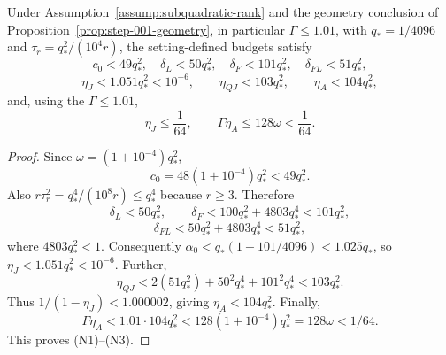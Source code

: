 \begin{proposition}\label{prop:step-009-numerical-slack}
Under Assumption~\ref{assump:subquadratic-rank} and the geometry conclusion
of Proposition~\ref{prop:step-001-geometry}, in particular
\(\Gamma\le1.01\), with \(q_*=1/4096\) and
\(\tau_r=q_*^2/(10^4r)\), the setting-defined budgets satisfy
\[
c_0<49q_*^2,\quad \delta_L<50q_*^2,\quad
\delta_F<101q_*^2,\quad \delta_{FL}<51q_*^2, \tag{N1}
\]
\[
\eta_J<1.051q_*^2<10^{-6},\qquad
\eta_{QJ}<103q_*^2,\qquad
\eta_A<104q_*^2, \tag{N2}
\]
and, using the \(\Gamma\le1.01\),
\[
\eta_J\le\frac1{64},\qquad
\Gamma\eta_A\le128\omega<\frac1{64}. \tag{N3}
\]

\begin{proof}
Since
\(\omega=(1+10^{-4})q_*^2\),
\[
c_0=48(1+10^{-4})q_*^2<49q_*^2.
\]
Also \(r\tau_r^2=q_*^4/(10^8r)\le q_*^4\) because \(r\ge3\). Therefore
\[
\delta_L<50q_*^2,\qquad
\delta_F<100q_*^2+4803q_*^4<101q_*^2,
\]
\[
\delta_{FL}<50q_*^2+4803q_*^4<51q_*^2,
\]
where \(4803q_*^2<1\). Consequently
\(\alpha_0<q_*(1+101/4096)<1.025q_*\), so
\(\eta_J<1.051q_*^2<10^{-6}\). Further,
\[
\eta_{QJ}<2(51q_*^2)+50^2q_*^4+101^2q_*^4
<103q_*^2.
\]
Thus \(1/(1-\eta_J)<1.000002\), giving
\(\eta_A<104q_*^2\). Finally,
\[
\Gamma\eta_A<1.01\cdot104q_*^2
<128(1+10^{-4})q_*^2=128\omega<1/64.
\]
This proves (N1)--(N3). 


\end{proof}
\end{proposition}
